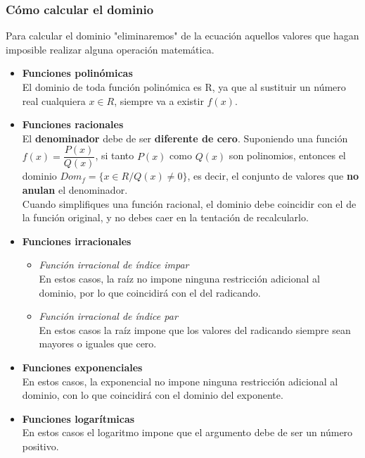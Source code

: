 \subsubsection{Cómo calcular el dominio}
Para calcular el dominio "eliminaremos" de la ecuación aquellos valores que hagan imposible realizar alguna operación matemática.
\begin{itemize}
	\item \textbf{Funciones polinómicas}\\
	El dominio de toda función polinómica es R, ya que al sustituir un número real cualquiera $x \in R$, siempre va a existir $f(x)$.
	\item \textbf{Funciones racionales}\\
	El \textbf{denominador} debe de ser \textbf{diferente de cero}. Suponiendo una función $f(x) = \dfrac{P(x)}{Q(x)}$, si tanto $P(x)$ como $Q(x)$ son polinomios, entonces el dominio $Dom_{f}= \{x \in R / Q(x) \neq 0\}$, es decir, el conjunto de valores que \textbf{no anulan} el denominador.\\
	Cuando simplifiques una función racional, el dominio debe coincidir con el de la función original, y no debes caer en la tentación de recalcularlo.
	\item \textbf{Funciones irracionales}\\
	\begin{itemize}
		\item \emph{Función irracional de índice impar}\\
		En estos casos, la raíz no impone ninguna restricción adicional al dominio, por lo que coincidirá con el del radicando.
		\item \emph{Función irracional de índice par}\\
		En estos casos la raíz impone que los valores del radicando siempre sean mayores o iguales que cero.
	\end{itemize}
	\item \textbf{Funciones exponenciales}\\
	En estos casos, la exponencial no impone ninguna restricción adicional al dominio, con lo que coincidirá con el dominio del exponente.
	\item \textbf{Funciones logarítmicas}\\
	En estos casos el logaritmo impone que el argumento debe de ser un número positivo. 	
\end{itemize}
